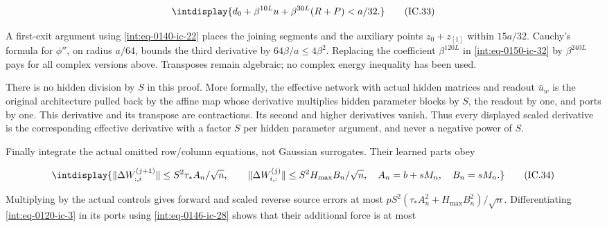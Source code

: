 \begingroup\renewcommand{\theHequation}{intdisplay.333}
\begin{equation}
\intdisplay{
d_0+\beta^{10L}u+\beta^{30L}(R+P)<a/32.
}
\tag{IC.33}
\label{int:eq-0151-ic-33}
\end{equation}
\endgroup


A first-exit argument using \eqref{int:eq-0140-ic-22} places the joining segments and the auxiliary points \(z_0+z_{[1]}\) within \(15a/32\). Cauchy's formula for \(\phi''\), on radius \(a/64\), bounds the third derivative by \(64\beta/a\le4\beta^2\). Replacing the coefficient \(\beta^{120L}\) in \eqref{int:eq-0150-ic-32} by \(\beta^{240L}\) pays for all complex versions above. Transposes remain algebraic; no complex energy inequality has been used.



There is no hidden division by \(S\) in this proof. More formally, the effective network with actual hidden matrices and readout \(\bar u_w\) is the original architecture pulled back by the affine map whose derivative multiplies hidden parameter blocks by \(S\), the readout by one, and ports by one. This derivative and its transpose are contractions. Its second and higher derivatives vanish. Thus every displayed scaled derivative is the corresponding effective derivative with a factor \(S\) per hidden parameter argument, and never a negative power of \(S\).



Finally integrate the actual omitted row/column equations, not Gaussian surrogates. Their learned parts obey


\begingroup\renewcommand{\theHequation}{intdisplay.334}
\begin{equation}
\intdisplay{
\|\Delta W_{:,i}^{(j+1)}\|
 \le S^2\tau_*A_n/\sqrt n,\qquad
 \|\Delta W_{i,:}^{(j)}\|
 \le S^2H_{\max}B_n/\sqrt n,
 \quad A_n=b+sM_n,\quad B_n=sM_n.
}
\tag{IC.34}
\label{int:eq-0152-ic-34}
\end{equation}
\endgroup


Multiplying by the actual controls gives forward and scaled reverse source errors at most \(pS^2(\tau_*A_n^2+H_{\max}B_n^2)/\sqrt n\). Differentiating \eqref{int:eq-0120-ic-3} in its ports using \eqref{int:eq-0146-ic-28} shows that their additional force is at most



